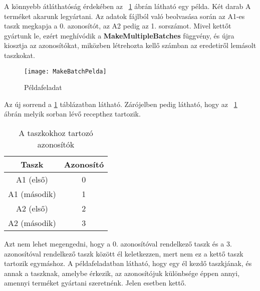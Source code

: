A könnyebb átláthatóság érdekében az ~\ref{MakeBatchPelda} ábrán látható egy példa. Két darab A terméket akarunk legyártani. Az adatok fájlból való beolvasása során az A1-es taszk megkapja a 0. azonosítót, az A2 pedig az 1. sorszámot. Mivel kettőt gyártunk le, ezért meghívódik a \textbf{MakeMultipleBatches} függvény, és újra kiosztja az azonosítókat, miközben létrehozta kellő számban az eredetiről lemásolt taszkokat. 
\begin{figure}[H]
\begin{center}
\texttt{[image: MakeBatchPelda]}
\caption{Példafeladat}
\label{MakeBatchPelda}
\end{center}
\end{figure}
Az új sorrend a \ref{tab:table1} táblázatban látható. Zárójelben pedig látható, hogy az ~\ref{MakeBatchPelda} ábrán melyik sorban lévő recepthez tartozik.
\begin{table}[H]
  \begin{center}
  	\caption{A taszkokhoz tartozó azonosítók}
  	\captionsetup[table]{skip=10pt}
    \label{tab:table1}
    \begin{tabular}{|c|c|}
      \textbf{Taszk} & \textbf{Azonosító} \\     
      \hline
      A1 (első) & 0\\
      A1 (második) & 1\\
      A2 (első) & 2\\
      A2 (második) & 3\\
    \end{tabular}
  \end{center}
\end{table}
Azt nem lehet megengedni, hogy a 0. azonosítóval rendelkező taszk és a 3. azonosítóval rendelkező taszk között él keletkezzen, mert nem ez a kettő taszk tartozik egymáshoz. A példafeladatban látható, hogy egy él kezdő taszkjának, és annak a taszknak, amelybe érkezik, az azonosítójuk különbsége éppen annyi, amennyi terméket gyártani szeretnénk. Jelen esetben kettő. 


